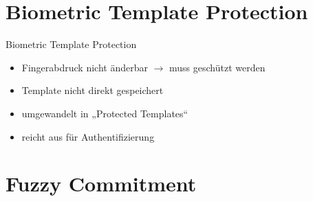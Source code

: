 \documentclass{beamer}
\begin{document}
\section{Biometric Template Protection}
\begin{frame}{Biometric Template Protection}
	\begin{itemize}
		\item Fingerabdruck nicht \"anderbar $\rightarrow$ muss gesch\"utzt werden
		\item Template nicht direkt gespeichert
		\item umgewandelt in „Protected Templates“
		\item reicht aus f\"ur Authentifizierung
	\end{itemize}
\end{frame}
\section{Fuzzy Commitment}
\end{document}
